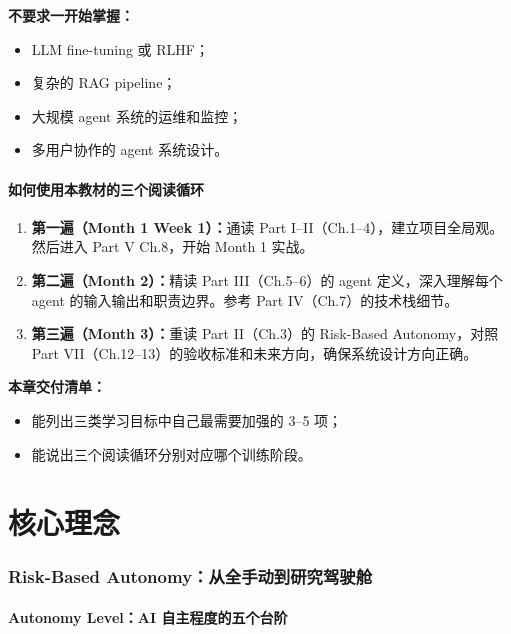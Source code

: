\documentclass[11pt,a4paper,fontset=fandol]{ctexart}
\begin{document}
\textbf{不要求一开始掌握：}
\begin{itemize}
  \item LLM fine-tuning 或 RLHF；
  \item 复杂的 RAG pipeline；
  \item 大规模 agent 系统的运维和监控；
  \item 多用户协作的 agent 系统设计。
\end{itemize}

\subsection{如何使用本教材的三个阅读循环}

\begin{enumerate}
  \item \textbf{第一遍（Month 1 Week 1）：}通读 Part I--II（Ch.1--4），建立项目全局观。然后进入 Part V Ch.8，开始 Month 1 实战。
  \item \textbf{第二遍（Month 2）：}精读 Part III（Ch.5--6）的 agent 定义，深入理解每个 agent 的输入输出和职责边界。参考 Part IV（Ch.7）的技术栈细节。
  \item \textbf{第三遍（Month 3）：}重读 Part II（Ch.3）的 Risk-Based Autonomy，对照 Part VII（Ch.12--13）的验收标准和未来方向，确保系统设计方向正确。
\end{enumerate}

\textbf{本章交付清单：}
\begin{itemize}
  \item 能列出三类学习目标中自己最需要加强的 3--5 项；
  \item 能说出三个阅读循环分别对应哪个训练阶段。
\end{itemize}

\newpage
\part{核心理念}

\section{Risk-Based Autonomy：从全手动到研究驾驶舱}

\subsection{Autonomy Level：AI 自主程度的五个台阶}
\end{document}
